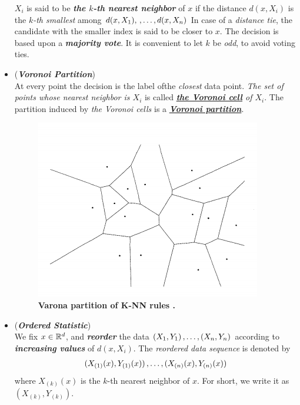 \documentclass[11pt]{article}
\begin{document}
\begin{itemize}
\begin{definition}
$X_i$ is said to be \emph{\textbf{the $k$-th nearest neighbor}} of $x$ if the distance $d(x,X_i)$ is the \emph{$k$-th smallest} among $d(x,X_1), \,{,}\ldots{,}\, d(x,X_n)$  In case of a \emph{distance tie}, the candidate with the smaller index is said to be closer to $x$. The decision is based upon a \emph{\textbf{majority vote}}. It is convenient to let $k$ be \emph{odd}, to avoid voting ties. 
\end{definition}

\item \begin{remark} (\emph{\textbf{Voronoi Partition}}) \\
At every point the decision is the label ofthe \emph{closest} data point. \emph{The set of points whose nearest neighbor is $X_i$} is called \emph{\textbf{\underline{the Voronoi cell}} of $X_i$}. The partition induced by \emph{the Voronoi cells} is a \underline{\emph{\textbf{Voronoi partition}}}.   
\end{remark}


\begin{figure}
\begin{minipage}[t]{1\linewidth}
  \centering
  \centerline{\includegraphics[scale = 0.6]{knn_voronoi_set.png}}
\end{minipage}
\caption{\footnotesize{\textbf{Varona partition of K-NN rules \citep{devroye2013probabilistic}. }}}
\label{fig: knn_voronoi_set}
\end{figure}

\item \begin{remark} (\emph{\textbf{Ordered Statistic}})\\
We fix $x \in {\mathbb R}^d$, and \emph{\textbf{reorder}} the data $(X_1, Y_1) \,{,}\ldots{,}\, (X_n , Y_n)$ according to \emph{\textbf{increasing values}} of $d(x, X_i)$. The \emph{reordered data sequence} is denoted by
\begin{align*}
(X_{(1)}(x), Y_{(1)}(x)) \,{,}\ldots{,}\, (X_{(n)}(x), Y_{(n)}(x)) 
\end{align*} where $X_{(k)}(x)$ is the $k$-th nearest neighbor of $x$. For short, we write it as $(X_{(k)}, Y_{(k)})$.
\end{remark}


\end{itemize}
\end{document}
